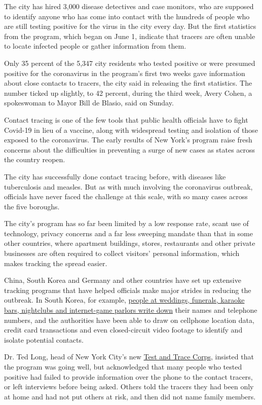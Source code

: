 The city has hired 3,000 disease detectives and case monitors, who are
supposed to identify anyone who has come into contact with the hundreds
of people who are still testing positive for the virus in the city every
day. But the first statistics from the program, which began on June 1,
indicate that tracers are often unable to locate infected people or
gather information from them.

Only 35 percent of the 5,347 city residents who tested positive or were
presumed positive for the coronavirus in the program's first two weeks
gave information about close contacts to tracers, the city said in
releasing the first statistics. The number ticked up slightly, to 42
percent, during the third week, Avery Cohen, a spokeswoman to Mayor Bill
de Blasio, said on Sunday.

Contact tracing is one of the few tools that public health officials
have to fight Covid-19 in lieu of a vaccine, along with widespread
testing and isolation of those exposed to the coronavirus. The early
results of New York's program raise fresh concerns about the
difficulties in preventing a surge of new cases as states across the
country reopen.

The city has successfully done contact tracing before, with diseases
like tuberculosis and measles. But as with much involving the
coronavirus outbreak, officials have never faced the challenge at this
scale, with so many cases across the five boroughs.

The city's program has so far been limited by a low response rate, scant
use of technology, privacy concerns and a far less sweeping mandate than
that in some other countries, where apartment buildings, stores,
restaurants and other private businesses are often required to collect
visitors' personal information, which makes tracking the spread easier.

China, South Korea and Germany and other countries have set up extensive
tracking programs that have helped officials make major strides in
reducing the outbreak. In South Korea, for example,
\href{https://www.nytimes3xbfgragh.onion/2020/05/09/world/asia/coronavirus-south-korea-second-wave.html}{people
at weddings, funerals, karaoke bars, nightclubs and internet-game
parlors write down} their names and telephone numbers, and the
authorities have been able to draw on cellphone location data, credit
card transactions and even closed-circuit video footage to identify and
isolate potential contacts.

Dr. Ted Long, head of New York City's new
\href{https://www.nychealthandhospitals.org/test-and-trace/}{Test and
Trace Corps}, insisted that the program was going well, but acknowledged
that many people who tested positive had failed to provide information
over the phone to the contact tracers, or left interviews before being
asked. Others told the tracers they had been only at home and had not
put others at risk, and then did not name family members.

